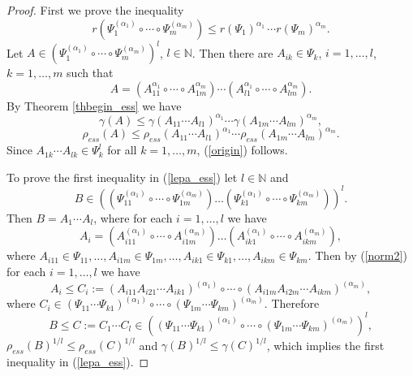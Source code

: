 \documentclass[12pt, reqno]{amsart}
\theoremstyle{definition}
\theoremstyle{remark}
\numberwithin{equation}{section}
\newcommand{\be}{\begin{equation}}
\newcommand{\ee}{\end{equation}}
\newcommand{\NN}{\mathbb{N}}
\begin{document}
\begin{proof}  
First we prove the inequality
\be
r (\Psi _1 ^{( \alpha _1)} \circ \cdots \circ \Psi _m ^{(\alpha _m)} ) \le 
r(\Psi _1)^{ \alpha _1} \, \cdots r(\Psi _m)^{\alpha _m}.
\label{origin}
\ee
Let $A \in (\Psi _1 ^{( \alpha _1)} \circ \cdots \circ \Psi _m ^{(\alpha _m)})^l$, $l \in \NN$. Then there are 
$A_{ik} \in \Psi _k$, $i=1, \ldots ,l$, $k=1,\ldots , m$ such that
$$A=(A_{11} ^{\alpha _1} \circ \cdots \circ A_{1m} ^{\alpha _m}) \cdots (A_{l1} ^{\alpha _1} \circ \cdots \circ A_{lm} ^{\alpha _m}).$$
By  Theorem \ref{thbegin_ess} %
we have 
\be
\gamma (A) \le \gamma (A_{11} \cdots A_{l1})^{\alpha _1} \cdots \gamma (A_{1m} \cdots A_{lm})^{\alpha _m},
\nonumber
\ee
\be
\rho _{ess}(A) \le \rho _{ess} (A_{11} \cdots A_{l1})^{\alpha _1} \cdots \rho _{ess} (A_{1m} \cdots A_{lm})^{\alpha _m}.
\label{useg}
\nonumber
\ee
Since $A_{1k} \cdots A_{lk} \in \Psi_k ^l$ for all $k=1,\ldots , m$, (\ref{origin}) follows. %

To prove the first inequality in (\ref{lepa_ess}) let $l\in \NN$ and 
$$B \in \left(\left(\Psi_{1 1}^{(\alpha _1)} \circ \cdots \circ \Psi_{1 m}^{(\alpha _m)}\right) \ldots \left(\Psi_{k 1}^{(\alpha _1)} \circ \cdots \circ \Psi_{k m}^{(\alpha _m)} \right)\right)^l.$$
Then $B=A_1 \cdots A_l$, where for each $i=1, \ldots , l$ we have
$$A_i = \left(A_{i1 1}^{(\alpha _1)} \circ \cdots \circ A_{i 1 m}^{(\alpha _m)}\right) \ldots \left(A_{i k 1}^{(\alpha _1)} \circ \cdots \circ A_{i k m}^{(\alpha _m)} \right),$$
where $A_{i1 1} \in \Psi_{1 1}, \ldots , A_{i1 m} \in \Psi_{1 m}, \ldots , A_{ik 1} \in \Psi_{k 1}, \ldots , A_{ikm} \in \Psi_{km}. $ 
Then by (\ref{norm2}) for each $i=1, \ldots , l$ we have
$$A_i \le C_i := (A_{i11}A_{i21} \cdots A_{ik1} )^{(\alpha_1)} \circ \cdots \circ (A_{i1m}A_{i2m} \cdots A_{ikm} )^{(\alpha_m)}, $$
where $C_i \in (\Psi_{1 1} \cdots  \Psi_{k 1})^{(\alpha _1)} \circ \cdots
\circ (\Psi_{1 m} \cdots \Psi_{k m})^{(\alpha _m)}.$ Therefore 
$$B \le C:=C_1 \cdots C_l \in \left((\Psi_{1 1} \cdots  \Psi_{k 1})^{(\alpha _1)} \circ \cdots
\circ (\Psi_{1 m} \cdots \Psi_{k m})^{(\alpha _m)}\right)^l,$$
$\rho_{ess} (B)^{1/l}\le \rho_{ess} (C)^{1/l}$ and $\gamma(B)^{1/l}\le \gamma(C)^{1/l}$, which implies the first inequality in (\ref{lepa_ess}).


\end{proof}
\end{document}
